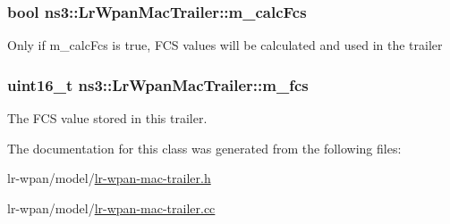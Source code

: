 \subsubsection[{\texorpdfstring{m\+\_\+calc\+Fcs}{m_calcFcs}}]{\setlength{\rightskip}{0pt plus 5cm}bool ns3\+::\+Lr\+Wpan\+Mac\+Trailer\+::m\+\_\+calc\+Fcs\hspace{0.3cm}{\ttfamily [private]}}\hypertarget{classns3_1_1LrWpanMacTrailer_a13461a0773b090951d9807e5849463c7}{}\label{classns3_1_1LrWpanMacTrailer_a13461a0773b090951d9807e5849463c7}
Only if m\+\_\+calc\+Fcs is true, F\+CS values will be calculated and used in the trailer 
\subsubsection[{\texorpdfstring{m\+\_\+fcs}{m_fcs}}]{\setlength{\rightskip}{0pt plus 5cm}uint16\+\_\+t ns3\+::\+Lr\+Wpan\+Mac\+Trailer\+::m\+\_\+fcs\hspace{0.3cm}{\ttfamily [private]}}\hypertarget{classns3_1_1LrWpanMacTrailer_a86cd487d10f4d7072a1a50d53640eb64}{}\label{classns3_1_1LrWpanMacTrailer_a86cd487d10f4d7072a1a50d53640eb64}
The F\+CS value stored in this trailer. 

The documentation for this class was generated from the following files\+:\begin{DoxyCompactItemize}
\item 
lr-\/wpan/model/\hyperlink{lr-wpan-mac-trailer_8h}{lr-\/wpan-\/mac-\/trailer.\+h}\item 
lr-\/wpan/model/\hyperlink{lr-wpan-mac-trailer_8cc}{lr-\/wpan-\/mac-\/trailer.\+cc}\end{DoxyCompactItemize}
